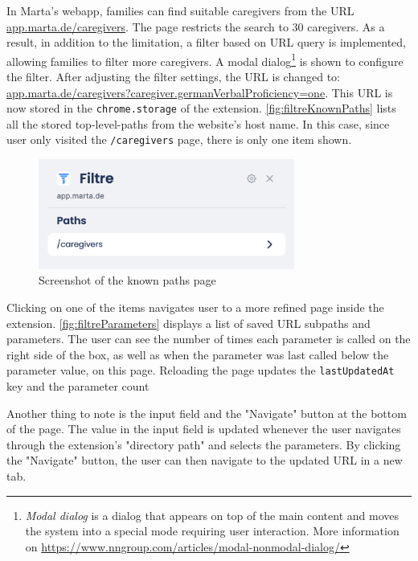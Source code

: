In Marta's webapp, families can find suitable caregivers from the URL \url{app.marta.de/caregivers}. The page restricts the search to 30 caregivers. As a result, in addition to the limitation, a filter based on URL query is implemented, allowing families to filter more caregivers. A modal dialog\footnote{\emph{Modal dialog} is a dialog that appears on top of the main content and moves the system into a special mode requiring user interaction. More information on \url{https://www.nngroup.com/articles/modal-nonmodal-dialog/}} is shown to configure the filter. After adjusting the filter settings, the URL is changed to: \url{app.marta.de/caregivers?caregiver.germanVerbalProficiency=one}. This URL is now stored in the \texttt{chrome.storage} of the extension. \autoref{fig:filtreKnownPaths} lists all the stored top-level-paths from the website's host name. In this case, since user only visited the \texttt{/caregivers} page, there is only one item shown.

\begin{figure}[H]
  \centering
  \includegraphics[width=0.75\textwidth]{assets/Filtre_known_paths.png}
  \caption{Screenshot of the known paths page}
  \label{fig:filtreKnownPaths}
\end{figure}

Clicking on one of the items navigates user to a more refined page inside the extension. \autoref{fig:filtreParameters} displays a list of saved URL subpaths and parameters. The user can see the number of times each parameter is called on the right side of the box, as well as when the parameter was last called below the parameter value, on this page. Reloading the page updates the \texttt{lastUpdatedAt} key and the parameter count

Another thing to note is the input field and the "Navigate" button at the bottom of the page. The value in the input field is updated whenever the user navigates through the extension's "directory path" and selects the parameters. By clicking the "Navigate" button, the user can then navigate to the updated URL in a new tab.

